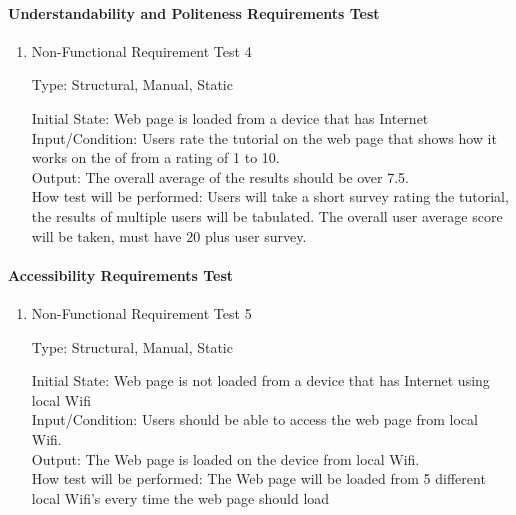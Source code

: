 \documentclass[12pt, titlepage]{article}
\begin{document}
\paragraph{Understandability and Politeness Requirements Test}

\begin{enumerate}

\item{Non-Functional Requirement Test 4\\}

Type: Structural, Manual, Static
					
Initial State: Web page is loaded from a device that has Internet \\
					
Input/Condition: Users rate the tutorial on the web page that shows how it works on the  of from a rating of 1 to 10. \\
					
Output: The overall average of the results should be over 7.5. \\
					
How test will be performed: Users will take a short survey rating the tutorial, the results of multiple users will be
tabulated. The overall user average score will be taken, must have 20 plus user survey. \\
\end{enumerate}

\paragraph{Accessibility Requirements Test}

\begin{enumerate}

\item{Non-Functional Requirement Test 5\\}

Type: Structural, Manual, Static
					
Initial State: Web page is not loaded from a device that has Internet using local Wifi \\
					
Input/Condition: Users should be able to access the web page from local Wifi. \\
					
Output: The Web page is loaded on the device from local Wifi. \\
					
How test will be performed: The Web page will be loaded from 5 different local Wifi's every time the web page should load   \\

\end{enumerate}
\end{document}
